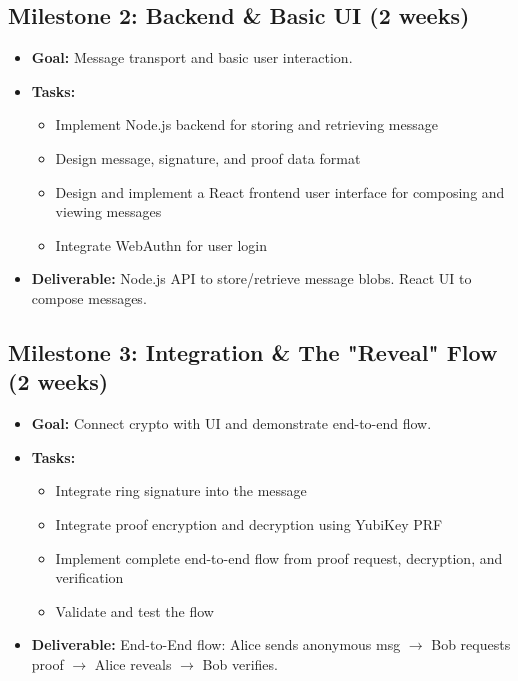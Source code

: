 \documentclass[letterpaper,11pt]{article}
\begin{document}
\subsection{Milestone 2: Backend \& Basic UI (2 weeks)}
\begin{itemize}
    \item \textbf{Goal:} Message transport and basic user interaction.
    \item \textbf{Tasks:}
    \begin{itemize}
        \item Implement Node.js backend for storing and retrieving message
        \item Design message, signature, and proof data format
        \item Design and implement a React frontend user interface for composing and viewing messages
        \item Integrate WebAuthn for user login
    \end{itemize}
    \item \textbf{Deliverable:} Node.js API to store/retrieve message blobs. React UI to compose messages.
\end{itemize}

\subsection{Milestone 3: Integration \& The "Reveal" Flow (2 weeks)}
\begin{itemize}
    \item \textbf{Goal:} Connect crypto with UI and demonstrate end-to-end flow.
    \item \textbf{Tasks:}
    \begin{itemize}
        \item Integrate ring signature into the message
        \item Integrate proof encryption and decryption using YubiKey PRF
        \item Implement complete end-to-end flow from proof request, decryption, and verification
        \item Validate and test the flow
    \end{itemize}
    \item \textbf{Deliverable:} End-to-End flow: Alice sends anonymous msg $\rightarrow$ Bob requests proof $\rightarrow$ Alice reveals $\rightarrow$ Bob verifies.
\end{itemize}
\end{document}
